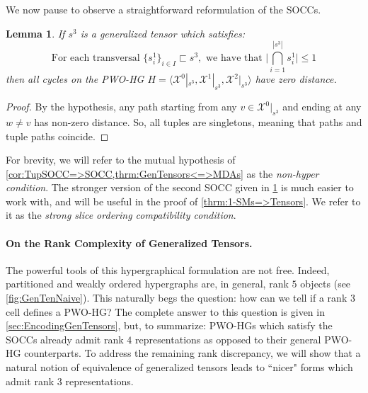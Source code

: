 \documentclass{article}
\theoremstyle{plain}
\newtheorem{lemma}[theorem]{Lemma}
\theoremstyle{definition}
\theoremstyle{remark}
\newcommand{\cX}{\mathcal{X}}
\let\oldparagraph\paragraph
\renewcommand{\paragraph}[1]{%
	\vspace{-0.5em}%
	\oldparagraph{#1}%
}
\begin{document}
We now pause to observe a straightforward reformulation of the SOCCs.
\begin{lemma}
	If $s^3$ is a generalized tensor which satisfies: 
	\begin{equation*}
		\text{For each transversal } \{s^1_i\}_{i\in I} \sqsubset s^3, \text{ we have that } \bigg| \bigcap_{i=1}^{|s^3|} s^1_i \bigg| \leq 1
	\end{equation*}
	then all cycles on the PWO-HG $H = \big\langle \cX^0|_{s^3}, \cX^1|_{s^3}, \cX^2|_{s^3} \big\rangle$ have zero distance.
	\label{cor:TupSOCC=>SOCC}
\end{lemma}
\begin{proof}
	By the hypothesis, any path starting from any $v \in \cX^0|_{s^3}$ and ending at any $w \neq v$ has non-zero distance. So, all tuples are singletons, meaning that paths and tuple paths coincide.
\end{proof}
For brevity, we will refer to the mutual hypothesis of \cref{cor:TupSOCC=>SOCC,thrm:GenTensors<=>MDAs} as the \textit{non-hyper condition}. The stronger version of the second SOCC given in \cref{cor:TupSOCC=>SOCC} is much easier to work with, and will be useful in the proof of \cref{thrm:1-SMs=>Tensors}. We refer to it as the \textit{strong slice ordering compatibility condition}.

\paragraph{On the Rank Complexity of Generalized Tensors.} The powerful tools of this hypergraphical formulation are not free. Indeed, partitioned and weakly ordered hypergraphs are, in general, rank $5$ objects (see \cref{fig:GenTenNaive}). This naturally begs the question: how can we tell if a rank $3$ cell defines a PWO-HG? The complete answer to this question is given in \cref{sec:EncodingGenTensors}, but, to summarize: PWO-HGs which satisfy the SOCCs already admit rank $4$ representations as opposed to their general PWO-HG counterparts. To address the remaining rank discrepancy, we will show that a natural notion of equivalence of generalized tensors leads to ``nicer" forms which admit rank $3$ representations.
\end{document}
